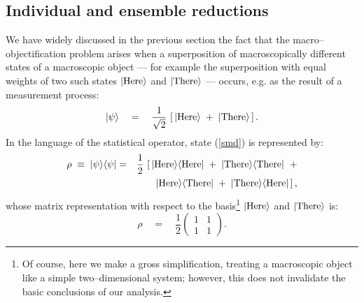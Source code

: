 \documentclass[10pt,a4paper]{article}
\begin{document}
\subsection{Individual and ensemble reductions} \label{sec41}

We have widely discussed in the previous section the fact that the
macro--objectification problem arises when a superposition of
macroscopically different states of a macroscopic object --- for
example the superposition with equal weights of two such states
$|\makebox{Here}\rangle$ and $|\makebox{There}\rangle$ --- occurs,
e.g. as the result of a measurement process:
\begin{equation} \label{smd}
|\psi\rangle \quad = \quad \frac{1}{\sqrt{2}}\,\left[\,
|\makebox{Here}\rangle \; + \; |\makebox{There}\rangle\, \right].
\end{equation}
In the language of the statistical operator, state (\ref{smd}) is
represented by:
\begin{eqnarray}
\rho \; \equiv \; |\psi\rangle\langle\psi| & = &
\frac{1}{2}\,\left[\, |\makebox{Here}\rangle\langle\makebox{Here}|
\; + \; |\makebox{There}\rangle\langle\makebox{There}| \right.\; +
\nonumber \\ & &
\quad\left.|\makebox{Here}\rangle\langle\makebox{There}| \; + \;
|\makebox{There}\rangle\langle\makebox{Here}|\, \right],
\end{eqnarray}
whose matrix representation with respect to the basis\footnote{ Of
course, here we make a gross simplification, treating a
macroscopic object like a simple two--dimensional system; however,
this does not invalidate the basic conclusions of our analysis.}
$|\makebox{Here}\rangle$ and $|\makebox{There}\rangle$ is:
\begin{equation}
\rho \quad = \quad \frac{1}{2} \left(
\begin{array}{cc}
1 & 1 \\ 1 & 1
\end{array}
\right).
\end{equation}
\end{document}
